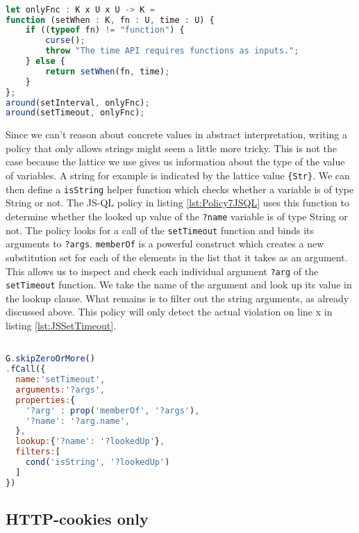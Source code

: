 \begin{lstlisting}[label={lst:Policy7Conscript},language=JavaScript,caption=Policy 7 in ConScript,mathescape=true]  % float=t?

let onlyFnc : K x U x U -> K =
function (setWhen : K, fn : U, time : U) {
    if ((typeof fn) != "function") {
        curse();
        throw "The time API requires functions as inputs.";
    } else {
        return setWhen(fn, time);
    }
};
around(setInterval, onlyFnc); 
around(setTimeout, onlyFnc);
\end{lstlisting}

Since we can't reason about concrete values in abstract interpretation, writing a policy that only allows strings might seem a little more tricky. This is not the case because the lattice we use gives us information about the type of the value of variables. A string for example is indicated by the lattice value \texttt{\{Str\}}. We can then define a \texttt{isString} helper function which checks whether a variable is of type String or not. The JS-QL policy in listing \ref{lst:Policy7JSQL} uses this function to determine whether the looked up value of the \texttt{?name} variable is of type String or not. The policy looks for a call of the \texttt{setTimeout} function and binds its arguments to \texttt{?args}. \texttt{memberOf} is a powerful construct which creates a new substitution set for each of the elements in the list that it takes as an argument.
This allows us to inspect and check each individual argument \texttt{?arg} of the \texttt{setTimeout} function. We take the name of the argument and look up its value in the lookup clause. What remains is to filter out the string arguments, as already discussed above. This policy will only detect the actual violation on line x in listing \ref{lst:JSSetTimeout}.

\begin{lstlisting}[label={lst:Policy7JSQL},language=JavaScript,caption=Policy 7 in JS-QL,mathescape=true]  % float=t?

G.skipZeroOrMore()
.fCall({
  name:'setTimeout',
  arguments:'?args',
  properties:{
    '?arg' : prop('memberOf', '?args'),
    '?name': '?arg.name',
  },
  lookup:{'?name': '?lookedUp'},
  filters:[
    cond('isString', '?lookedUp')
  ]
})
\end{lstlisting}


\subsection{HTTP-cookies only}
\label{subsec:HTTPOnly}

